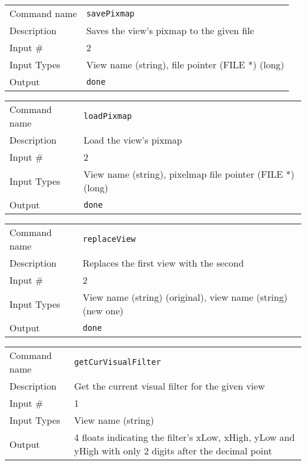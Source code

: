 \bigskip

\noindent
\begin{tabular}{l|p{5in}}
\hline
Command name & {\tt savePixmap} \\
Description  & Saves the view's pixmap to the given file \\
Input \#     & 2 \\
Input Types  & View name (string), file pointer (FILE *) (long) \\
Output       & {\tt done} \\
\hline
\end{tabular}

\bigskip

\noindent
\begin{tabular}{l|p{5in}}
\hline
Command name & {\tt loadPixmap} \\
Description  & Load the view's pixmap \\
Input \#     & 2 \\
Input Types  & View name (string), pixelmap file pointer (FILE *) (long) \\
Output       & {\tt done} \\
\hline
\end{tabular}

\bigskip

\noindent
\begin{tabular}{l|p{5in}}
\hline
Command name & {\tt replaceView} \\
Description  & Replaces the first view with the second \\
Input \#     & 2 \\
Input Types  & View name (string) (original), view name (string) (new one) \\
Output       & {\tt done} \\
\hline
\end{tabular}

\bigskip

\noindent
\begin{tabular}{l|p{5in}}
\hline
Command name & {\tt getCurVisualFilter} \\
Description  & Get the current visual filter for the given view \\
Input \#     & 1 \\
Input Types  & View name (string) \\
Output       & 4 floats indicating the filter's xLow, xHigh, yLow and yHigh
               with only 2 digits after the decimal point \\
\hline
\end{tabular}

